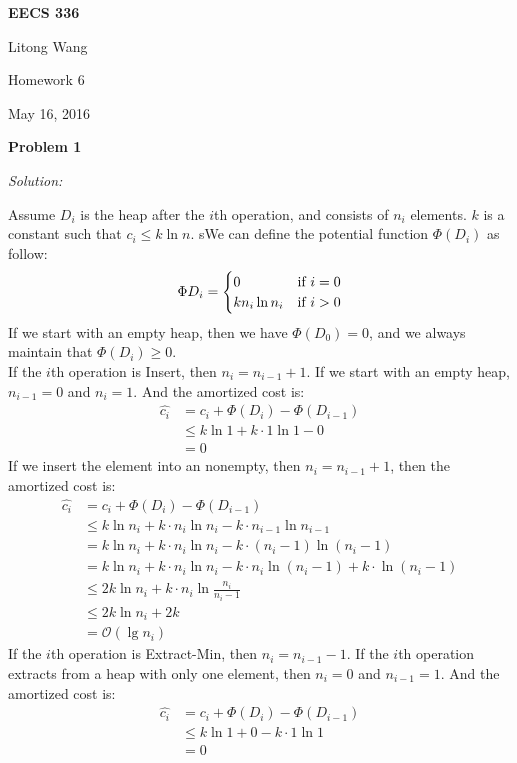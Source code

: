 \documentclass[12pt,letterpaper]{article}
\def\pp{\par\noindent}
\newcommand{\problem}[1]{ \bigskip \pp \textbf{Problem #1}\par}
\newcommand{\solution}{\textit{Solution:}\par}
\begin{document}
\centerline{\bf EECS 336}

\medskip
\centerline{Litong Wang}
\centerline{Homework 6}
\centerline{May 16, 2016}
\bigskip


\problem{1}
\solution
Assume $D_i$ is the heap after the $i$th operation, and consists of $n_i$ elements. $k$ is a constant such that $c_i \le k \ln n$. sWe can define the potential function $\Phi(D_i)$ as follow: 
\begin{equation}
    \Phi{D_i}=
   \begin{cases}
   0 &\mbox{if $i = 0 $}\\
   k n_i \ln n_i &\mbox{if $ i > 0$}
   \end{cases}
\end{equation}
If we start with an empty heap, then we have $\Phi(D_0) = 0$, and we always maintain that $\Phi(D_i) \ge 0.$ \\
If the $i$th operation is Insert, then $n_i = n_{i-1} + 1$. If we start with an empty heap, $n_{i-1} = 0$ and $n_i = 1$. And the amortized cost is: 
\begin{align*}
\widehat{c_i} &= c_i + \Phi(D_i) - \Phi(D_{i-1}) \\
&\le k \ln 1 + k \cdot 1 \ln 1 - 0 \\
&= 0
\end{align*}
If we insert the element into an nonempty, then $n_i = n_{i-1} + 1$, then the amortized cost is:
\begin{align*}
\widehat{c_i} &= c_i + \Phi(D_i) - \Phi(D_{i-1}) \\
&\le k \ln n_i + k \cdot n_i \ln n_i - k \cdot n_{i-1} \ln n_{i-1} \\
&= k \ln n_i + k \cdot n_i \ln n_i - k \cdot (n_i - 1) \ln (n_i -1) \\
&= k \ln n_i + k \cdot n_i \ln n_i - k \cdot n_i \ln (n_i -1) + k \cdot \ln (n_i - 1) \\
&\le 2 k \ln n_i + k \cdot n_i \ln \frac{n_i}{n_i - 1} \\
&\le 2 k \ln n_i + 2k \\
&= \mathcal{O}(\lg n_i)
\end{align*}
If the $i$th operation is Extract-Min, then $n_i = n_{i-1} -1$. If the $i$th operation extracts from a heap with only one element, then $n_i = 0$ and $n_{i-1} = 1$. And the amortized cost is:
\begin{align*}
\widehat{c_i} &= c_i + \Phi(D_i) - \Phi(D_{i-1}) \\
&\le k \ln 1 + 0 - k \cdot 1 \ln 1 \\
&= 0
\end{align*}
\end{document}
